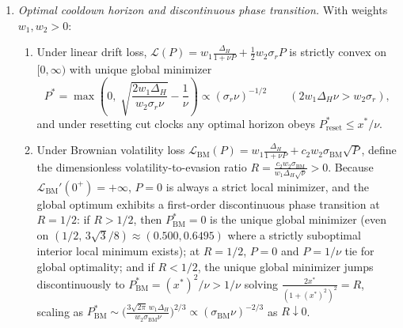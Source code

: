 \begin{theorem}
\begin{enumerate}[label=(\roman*), leftmargin=2.2em, itemsep=2pt]
\item \emph{Optimal cooldown horizon and discontinuous phase transition.} With weights $w_1, w_2 > 0$:
\begin{enumerate}[label=(\alph*), leftmargin=1.8em, itemsep=2pt]
\item Under linear drift loss, $\mathcal{L}(P) = w_1\frac{\Delta_H}{1 + \nu P} + \frac{1}{2}w_2 \sigma_r P$ is strictly convex on $[0, \infty)$ with unique global minimizer
\begin{equation}\label{eq:pstar_linear}
P^* = \max\!\left(0,\; \sqrt{\frac{2 w_1 \Delta_H}{w_2 \sigma_r \nu}} - \frac{1}{\nu}\right) \propto (\sigma_r \nu)^{-1/2} \qquad (2 w_1 \Delta_H \nu > w_2 \sigma_r),
\end{equation}
and under resetting cut clocks any optimal horizon obeys $P^*_{\mathrm{reset}} \le x^*/\nu$.
\item Under Brownian volatility loss $\mathcal{L}_{\mathrm{BM}}(P) = w_1\frac{\Delta_H}{1 + \nu P} + c_2 w_2 \sigma_{\mathrm{BM}}\sqrt{P}$, define the dimensionless volatility-to-evasion ratio $R = \frac{c_2 w_2 \sigma_{\mathrm{BM}}}{w_1 \Delta_H \sqrt{\nu}} > 0$. Because $\mathcal{L}_{\mathrm{BM}}'(0^+) = +\infty$, $P = 0$ is always a strict local minimizer, and the global optimum exhibits a first-order discontinuous phase transition at $R = 1/2$: if $R > 1/2$, then $P^*_{\mathrm{BM}} = 0$ is the unique global minimizer (even on $(1/2,\, 3\sqrt{3}/8) \approx (0.500, 0.6495)$ where a strictly suboptimal interior local minimum exists); at $R = 1/2$, $P = 0$ and $P = 1/\nu$ tie for global optimality; and if $R < 1/2$, the unique global minimizer jumps discontinuously to $P^*_{\mathrm{BM}} = (x^*)^2/\nu > 1/\nu$ solving $\frac{2 x^*}{(1 + (x^*)^2)^2} = R$, scaling as $P^*_{\mathrm{BM}} \sim \bigl(\frac{3\sqrt{2\pi}\,w_1 \Delta_H}{w_2 \sigma_{\mathrm{BM}} \nu}\bigr)^{2/3} \propto (\sigma_{\mathrm{BM}}\nu)^{-2/3}$ as $R \downarrow 0$.
\end{enumerate}
\end{enumerate}
\end{theorem}

